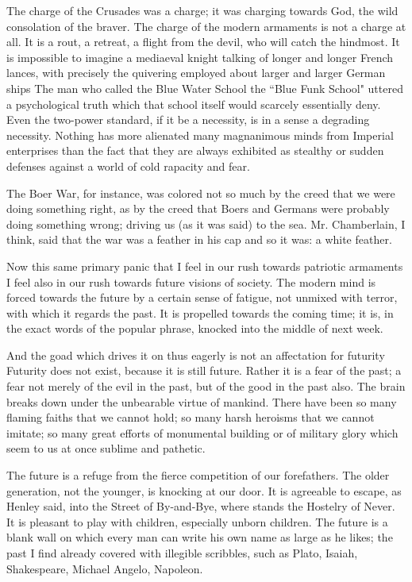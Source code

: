 \documentclass[final,10pt,letterpaper,twocolumn,openany]{book}
\begin{document}
 The charge of the Crusades was a charge;
it was charging towards God, the wild consolation of the braver. The
charge of the modern armaments is not a charge at all. It is a rout, a retreat,
a flight from the devil, who will catch the hindmost. It is impossible to
imagine a mediaeval knight talking of longer and longer French lances,
with precisely the quivering employed about larger and larger German
ships The man who called the Blue Water School the ``Blue Funk School"
uttered a psychological truth which that school itself would scarcely
essentially deny. Even the two-power standard, if it be a necessity, is in a
sense a degrading necessity. Nothing has more alienated many
magnanimous minds from Imperial enterprises than the fact that they are
always exhibited as stealthy or sudden defenses against a world of cold
rapacity and fear. 

The Boer War, for instance, was colored not so much by
the creed that we were doing something right, as by the creed that Boers
and Germans were probably doing something wrong; driving us (as it was
said) to the sea. Mr. Chamberlain, I think, said that the war was a feather
in his cap and so it was: a white feather.

Now this same primary panic that I feel in our rush towards patriotic
armaments I feel also in our rush towards future visions of society. The
modern mind is forced towards the future by a certain sense of fatigue, not
unmixed with terror, with which it regards the past. It is propelled towards
the coming time; it is, in the exact words of the popular phrase, knocked
into the middle of next week. 

And the goad which drives it on thus eagerly
is not an affectation for futurity Futurity does not exist, because it is still
future. Rather it is a fear of the past; a fear not merely of the evil in the
past, but of the good in the past also. The brain breaks down under the
unbearable virtue of mankind. There have been so many flaming faiths
that we cannot hold; so many harsh heroisms that we cannot imitate; so
many great efforts of monumental building or of military glory which
seem to us at once sublime and pathetic. 

The future is a refuge from the
fierce competition of our forefathers. The older generation, not the
younger, is knocking at our door. It is agreeable to escape, as Henley said,
into the Street of By-and-Bye, where stands the Hostelry of Never. It is
pleasant to play with children, especially unborn children. The future is a
blank wall on which every man can write his own name as large as he
likes; the past I find already covered with illegible scribbles, such as Plato,
Isaiah, Shakespeare, Michael Angelo, Napoleon.
\end{document}
